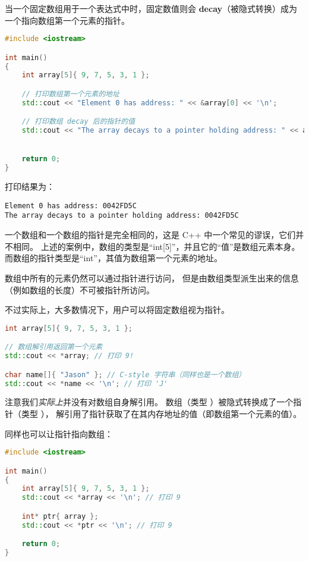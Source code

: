 \documentclass[../../LearnCpp.tex]{subfiles}
\begin{document}

当一个固定数组用于一个表达式中时，固定数值则会 \textbf{decay}（被隐式转换）成为一个指向数组第一个元素的指针。

\begin{lstlisting}[language=C++]
#include <iostream>

int main()
{
    int array[5]{ 9, 7, 5, 3, 1 };

    // 打印数组第一个元素的地址
    std::cout << "Element 0 has address: " << &array[0] << '\n';

    // 打印数组 decay 后的指针的值
    std::cout << "The array decays to a pointer holding address: " << array << '\n';


    return 0;
}
\end{lstlisting}

打印结果为：

\begin{lstlisting}
Element 0 has address: 0042FD5C
The array decays to a pointer holding address: 0042FD5C
\end{lstlisting}

一个数组和一个数组的指针是完全相同的，这是 C++ 中一个常见的谬误，它们并不相同。
上述的案例中，数组的类型是“int[5]”，并且它的“值”是数组元素本身。
而数组的指针类型是“int\*”，其值为数组第一个元素的地址。

数组中所有的元素仍然可以通过指针进行访问，
但是由数组类型派生出来的信息（例如数组的长度）不可被指针所访问。

不过实际上，大多数情况下，用户可以将固定数组视为指针。

\begin{lstlisting}[language=C++]
int array[5]{ 9, 7, 5, 3, 1 };

// 数组解引用返回第一个元素
std::cout << *array; // 打印 9!

char name[]{ "Jason" }; // C-style 字符串（同样也是一个数组）
std::cout << *name << '\n'; // 打印 'J'
\end{lstlisting}

注意我们\textit{实际上}并没有对数组自身解引用。
数组（类型 ）被隐式转换成了一个指针（类型 ），
解引用了指针获取了在其内存地址的值（即数组第一个元素的值）。

同样也可以让指针指向数组：

\begin{lstlisting}[language=C++]
#include <iostream>

int main()
{
    int array[5]{ 9, 7, 5, 3, 1 };
    std::cout << *array << '\n'; // 打印 9

    int* ptr{ array };
    std::cout << *ptr << '\n'; // 打印 9

    return 0;
}
\end{lstlisting}
\end{document}
